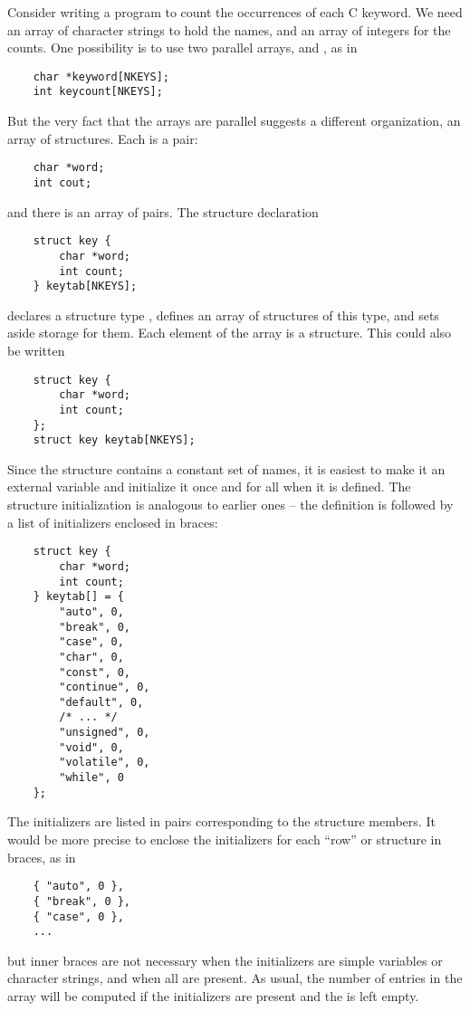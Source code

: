 Consider writing a program to count the occurrences of each C keyword.
We need an array of character strings to hold the names, and an array of integers for the counts.
One possibility is to use two parallel arrays,  and , as in
\begin{lstlisting}
	char *keyword[NKEYS];
	int keycount[NKEYS];
\end{lstlisting}
But the very fact that the arrays are parallel suggests a different organization, an array of structures.
Each  is a pair:
\begin{lstlisting}
	char *word;
	int cout;
\end{lstlisting}
and there is an array of pairs.
The structure declaration
\begin{lstlisting}
	struct key {
		char *word;
		int count;
	} keytab[NKEYS];
\end{lstlisting}
declares a structure type , defines an array  of structures of this type, and sets aside storage for them.
Each element of the array is a structure.
This could also be written
\begin{lstlisting}
	struct key {
		char *word;
		int count;
	};
	struct key keytab[NKEYS];
\end{lstlisting}
Since the structure  contains a constant set of names, it is easiest to make it an external variable and initialize it once and for all when it is defined.
The structure initialization is analogous to earlier ones -- the definition is followed by a list of initializers enclosed in braces:
\begin{lstlisting}
	struct key {
		char *word;
		int count;
	} keytab[] = {
		"auto", 0,
		"break", 0,
		"case", 0,
		"char", 0,
		"const", 0,
		"continue", 0,
		"default", 0,
		/* ... */
		"unsigned", 0,
		"void", 0,
		"volatile", 0,
		"while", 0
	};
\end{lstlisting}
The initializers are listed in pairs corresponding to the structure members.
It would be more precise to enclose the initializers for each ``row'' or structure in braces, as in
\begin{lstlisting}
	{ "auto", 0 },
	{ "break", 0 },
	{ "case", 0 },
	...
\end{lstlisting}
but inner braces are not necessary when the initializers are simple variables or character strings, and when all are present.
As usual, the number of entries in the array  will be computed if the initializers are present and the \code{[]} is left empty.

